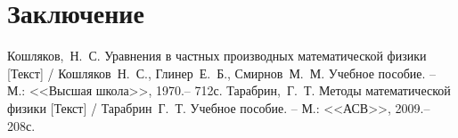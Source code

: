 \section{Заключение}
\newpage

\begin{thebibliography}{9}
    Кошляков,~Н.~С. Уравнения в частных производных
    математической физики [Текст] / Кошляков~Н.~С., Глинер~Е.~Б., Смирнов~М.~М.
    Учебное пособие. -- М.: <<Высшая школа>>, 1970.-- 712с.
    Тарабрин,~Г.~Т.  Методы математической физики [Текст] /
    Тарабрин~Г.~Т. Учебное пособие. -- М.: <<АСВ>>, 2009.-- 208с.
\end{thebibliography}

